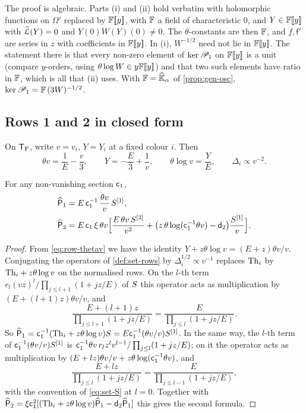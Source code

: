 The proof is algebraic. Parts (i) and (ii) hold verbatim with holomorphic functions on $\Omega'$ replaced by $\mathbb{F}[\![ y ]\!]$, with $\mathbb{F}$ a field of characteristic $0$, and $Y\in\mathbb{F}[\![ y ]\!]$ with $\widehat{\mathcal{L}}(Y)=0$ and $Y(0)W(Y)(0)\neq0$. The $\theta$-constants are then $\mathbb{F}$, and $f,\mathsf{f}'$ are series in $z$ with coefficients in $\mathbb{F}[\![ y ]\!]$. In (i), $W^{-1/2}$ need not lie in $\mathbb{F}[\![ y ]\!]$. The statement there is that every non-zero element of $\ker\mathscr{P}_1$ on $\mathbb{F}[\![ y ]\!]$ is a unit (compare $y$-orders, using $\theta\log W\in y\mathbb{F}[\![ y ]\!]$) and that two such elements have ratio in $\mathbb{F}$, which is all that (ii) uses. With $\mathbb{F}=\widehat{\mathbb{K}}_{\alpha}$ of \cref{prop:gen-osc}, $\ker\mathscr{P}_1=\mathbb{F}\,(3W)^{-1/2}$.

\subsection{Rows 1 and 2 in closed form}
\label{sec:row-closed12}

On $\mathsf{T}_{\mathrm{F}}$, write $v=v_i$, $Y=Y_i$ at a fixed colour $i$. Then
\begin{equation}
\label{eq:row-thetav}
\theta v=\frac1E-\frac v3,\qquad Y=-\frac E3+\frac1v,\qquad\theta\log v=\frac YE,\qquad\Delta_i\propto v^{-2}.
\end{equation}

\begin{lem}
\label{lem:row-closed12}
For any non-vanishing section $\mathsf{c}_{1}$,
\begin{align*}
\widehat{\mathsf{P}}_1&=E\,\mathsf{c}_{1}^{-1}\,\frac{\theta v}{v}\,S^{[1]},\\
\widehat{\mathsf{P}}_2&=E\,\mathsf{c}_{1}\,\xi\,\theta v\Big[\frac{E\,\theta v\,S^{[2]}}{v^2}+\big(z\,\theta\log(\mathsf{c}_{1}^{-1}\theta v)-\mathsf{d}_{2}\big)\frac{S^{[1]}}{v}\Big].
\end{align*}
\end{lem}

\begin{proof}
From \eqref{eq:row-thetav} we have the identity $Y+z\theta\log v=(E+z)\theta v/v$. Conjugating the operators of \cref{def:set-rows} by $\Delta_i^{1/2}\propto v^{-1}$ replaces $\mathrm{Th}_i$ by $\mathrm{Th}_i+z\theta\log v$ on the normalised rows. On the $l$-th term $r_l(vz)^l/\prod_{j\leq l+1}(1+jz/E)$ of $S$ this operator acts as multiplication by $(E+(l+1)z)\theta v/v$, and
\[
\frac{E+(l+1)z}{\prod_{j\leq l+1}(1+jz/E)}=\frac{E}{\prod_{j\leq l}(1+jz/E)}.
\]
So $\widehat{\mathsf{P}}_1=\mathsf{c}_{1}^{-1}(\mathrm{Th}_i+z\theta\log v)S=E\mathsf{c}_{1}^{-1}(\theta v/v)S^{[1]}$. In the same way, the $l$-th term of $\mathsf{c}_{1}^{-1}(\theta v/v)S^{[1]}$ is $\mathsf{c}_{1}^{-1}\theta v\,r_lz^lv^{l-1}/\prod_{j\leq l}(1+jz/E)$; on it the operator acts as multiplication by $(E+lz)\theta v/v+z\theta\log(\mathsf{c}_{1}^{-1}\theta v)$, and
\[
\frac{E+lz}{\prod_{j\leq l}(1+jz/E)}=\frac{E}{\prod_{j\leq l-1}(1+jz/E)},
\]
with the convention of \eqref{eq:set-S} at $l=0$. Together with $\widehat{\mathsf{P}}_2=\xi\mathsf{c}_{1}^2[(\mathrm{Th}_i+z\theta\log v)\widehat{\mathsf{P}}_1-\mathsf{d}_{2}\widehat{\mathsf{P}}_1]$ this gives the second formula.
\end{proof}

